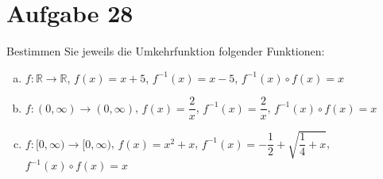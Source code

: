 \section{Aufgabe 28}
\setcounter{section}{28}

Bestimmen Sie jeweils die Umkehrfunktion folgender Funktionen:
\begin{enumerate}[(a)]
    \item $f : \mathbb{R} \rightarrow \mathbb{R}$, $f(x) = x + 5$, $f^{-1}(x) = x - 5$, $f^{-1}(x) \circ f(x) = x$
    \item $f : (0, \infty) \rightarrow (0, \infty)$, $f(x) = \dfrac{2}{x}$, $f^{-1}(x) = \dfrac{2}{x}$, $f^{-1}(x) \circ f(x) = x$
    \item $f : [0, \infty) \rightarrow [0, \infty)$, $f(x) = x^2 + x$, $f^{-1}(x) = -\dfrac{1}{2} + \sqrt{\dfrac{1}{4} + x}$, $f^{-1}(x) \circ f(x) = x$
\end{enumerate}
